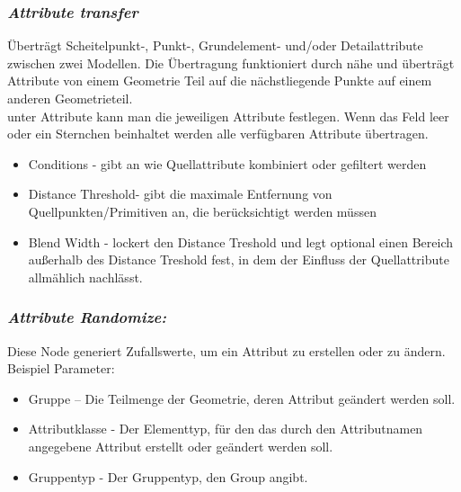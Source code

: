 \documentclass[paper=a4,fontsize=12pt,ngerman]{scrartcl}
\begin{document}
 	\subsubsection*{\textit{Attribute transfer}}
 	Überträgt Scheitelpunkt-, Punkt-, Grundelement- und/oder Detailattribute zwischen zwei Modellen.
 	Die Übertragung funktioniert durch nähe und überträgt Attribute von einem Geometrie Teil auf die nächstliegende Punkte auf einem anderen Geometrieteil. \\
 	unter Attribute kann man die jeweiligen Attribute festlegen. Wenn das Feld leer oder ein Sternchen beinhaltet werden alle verfügbaren Attribute übertragen.
 	\begin{itemize}
 		\item Conditions - gibt an wie Quellattribute kombiniert oder gefiltert werden
 		\item Distance Threshold- gibt die maximale Entfernung von Quellpunkten/Primitiven an, die berücksichtigt werden müssen
 		\item Blend Width - lockert den Distance Treshold und legt optional einen Bereich außerhalb des Distance Treshold fest, in dem der Einfluss der Quellattribute allmählich nachlässt.
 	\end{itemize}
 	
 	\subsubsection*{\textit{Attribute Randomize:}}
 	Diese Node generiert Zufallswerte, um ein Attribut zu erstellen oder zu ändern. Beispiel Parameter: 
 	\begin{itemize}
 		\item Gruppe – Die Teilmenge der Geometrie, deren Attribut geändert werden soll.
 		\item Attributklasse - Der Elementtyp, für den das durch den Attributnamen angegebene Attribut erstellt oder geändert werden soll.
 		\item Gruppentyp - Der Gruppentyp, den Group angibt.
 	\end{itemize}
 	
\end{document}
